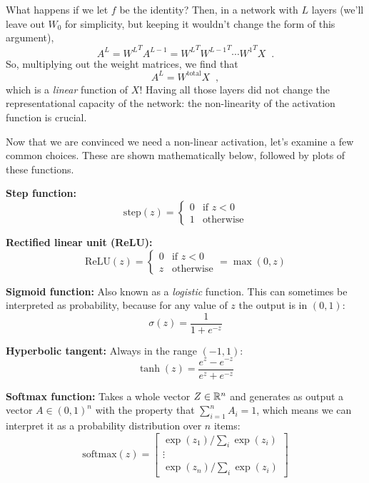 What happens if we let $f$ be the identity?  Then, in a network with
$L$ layers (we'll leave out $W_0$ for simplicity, but keeping it
wouldn't change the form of this argument),
\[A^L = {W^L}^T A^{L-1} =
    {W^L}^T {W^{L-1}}^T \cdots {W^1}^T X\;\;.\]
So, multiplying out the weight matrices, we find that
\[A^L = W^\text{total}X\;\;,\]
which is a {\em linear} function of $X$!
Having all those layers did not change the representational
capacity of the network: the non-linearity of the activation function
is crucial.

Now that we are convinced we need a non-linear activation, let's
examine a few common choices.
These are shown mathematically below, followed by plots of these functions.
\begin{description}
  \item{\bf Step function:} 
        $$\text{step}(z) =
          \begin{cases}
            0 & \text{if $z<0$}  \\
            1 & \text{otherwise}
          \end{cases}$$
  \item{\bf Rectified linear unit (ReLU):} 
        $$\text{ReLU}(z) =
          \begin{cases}
            0 & \text{if $z<0$}  \\
            z & \text{otherwise}
          \end{cases} = \max(0,z)$$
  \item{\bf Sigmoid function:} Also known as a {\em logistic} function. This can sometimes
        be interpreted as probability, because for any value of $z$ the
        output is in $(0, 1)$:
        $$\sigma(z) = \frac{1}{1+e^{-z}}$$
  \item{\bf Hyperbolic tangent:} Always in the range $(-1, 1)$:
        $$\tanh(z) = \frac{e^z - e^{-z}}{e^z + e^{-z}}$$
  \item{\bf Softmax function:}
        Takes a whole vector $Z \in \mathbb{R}^n$ and generates as output a vector
        $A \in (0, 1)^n$ with the property that $\sum_{i = 1}^n A_i = 1$,
        which means we can interpret it as a probability distribution over $n$ items:
        \[\text{softmax}(z) =
          \begin{bmatrix}
            \exp(z_1) / \sum_{i} \exp(z_i) \\
            \vdots                         \\
            \exp(z_n) / \sum_{i} \exp(z_i)
          \end{bmatrix}\]

\end{description}

